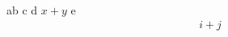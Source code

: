 \documentclass{article}
\begin{document}
ab c
d $x + y$ e
\begin{align}
    i + j
\end{align}
\end{document}

